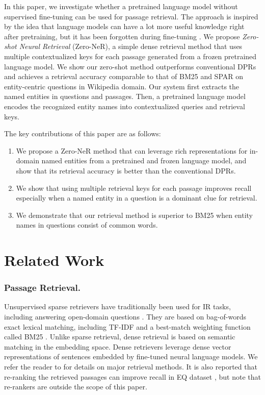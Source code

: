 \documentclass[letterpaper]{article} \usepackage{aaai23}  \usepackage{times}  \usepackage{helvet}  \usepackage{courier}  \usepackage[hyphens]{url}  \usepackage{graphicx} \urlstyle{rm} \def\UrlFont{\rm}  \usepackage{natbib}  \usepackage{caption} \frenchspacing  \setlength{\pdfpagewidth}{8.5in}  \setlength{\pdfpageheight}{11in}  \usepackage{algorithm}
\begin{document}
In this paper, we investigate whether a pretrained language model without supervised fine-tuning can be used for passage retrieval.
The approach is inspired by the idea that language models can have a lot more useful knowledge right after pretraining, but it has been forgotten during fine-tuning \citep[e.g.,][]{chen-etal-2020-recall}.
We propose \textit{Zero-shot Neural Retrieval} (Zero-NeR), a simple dense retrieval method that uses multiple contextualized keys for each passage generated from a frozen pretrained language model.
We show our zero-shot method outperforms conventional DPRs and achieves a retrieval accuracy comparable to that of BM25 and SPAR on entity-centric questions in Wikipedia domain.
Our system first extracts the named entities in questions and passages.
Then, a pretrained language model encodes the recognized entity names into contextualized queries and retrieval keys.

The key contributions of this paper are as follows:
\begin{enumerate}
	\item We propose a Zero-NeR method that can leverage rich representations for in-domain named entities from a pretrained and frozen language model, and show that its retrieval accuracy is better than the conventional DPRs.
	\item We show that using multiple retrieval keys for each passage improves recall especially when a named entity in a question is a dominant clue for retrieval.
	\item We demonstrate that our retrieval method is superior to BM25 when entity names in questions consist of common words.
\end{enumerate}

\section{Related Work}\label{sec:related}
\subsubsection{Passage Retrieval.}
Unsupervised sparse retrievers have traditionally been used for IR tasks, including answering open-domain questions \citep{chen-etal-2017-reading}.
They are based on bag-of-words exact lexical matching, including TF-IDF and a best-match weighting function called BM25 \citep{robertson1995okapi, robertson2009probabilistic}.
Unlike sparse retrieval, dense retrieval is based on semantic matching in the embedding space.
Dense retrievers leverage dense vector representations of sentences embedded by fine-tuned neural language models.
We refer the reader to \citet{thakur2021beir} for details on major retrieval methods.
It is also reported that re-ranking the retrieved passages can improve recall in EQ dataset \citep[e.g.,][]{sachan2022improving}, but note that re-rankers are outside the scope of this paper.
\end{document}
